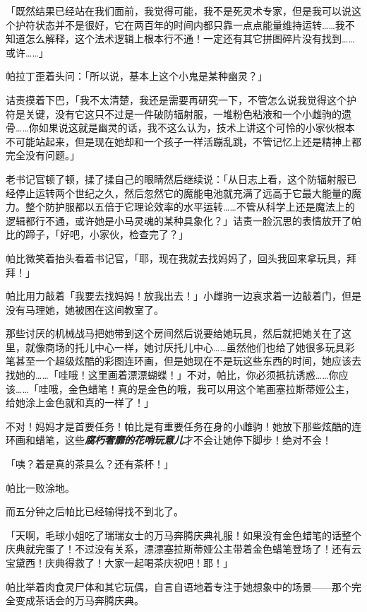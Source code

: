 「既然结果已经站在我们面前，我觉得可能，我不是死灵术专家，但是我可以说这个护符状态并不是很好，它在两百年的时间内都只靠一点点能量维持运转……我不知道怎么解释，这个法术逻辑上根本行不通！一定还有其它拼图碎片没有找到……或许……」

帕拉丁歪着头问：「所以说，基本上这个小鬼是某种幽灵？」

诘责摸着下巴，「我不太清楚，我还是需要再研究一下，不管怎么说我觉得这个护符是关键，没有它这只不过是一件破防辐射服，一堆粉色粘液和一个小雌驹的遗骨……你如果说这就是幽灵的话，我不这么认为，技术上讲这个可怜的小家伙根本不可能站起来，但是现在她却和一个孩子一样活蹦乱跳，不管记忆上还是精神上都完全没有问题。」

老书记官顿了顿，揉了揉自己的眼睛然后继续说：「从日志上看，这个防辐射服已经停止运转两个世纪之久，然后忽然它的魔能电池就充满了远高于它最大能量的魔力。整个防护服都以五倍于它理论效率的水平运转……不管从科学上还是魔法上的逻辑都行不通，或许她是小马灵魂的某种具象化？」诘责一脸沉思的表情放开了帕比的蹄子，「好吧，小家伙，检查完了？」

帕比微笑着抬头看着书记官，「耶，现在我就去找妈妈了，回头我回来拿玩具，拜拜！」

\horizonline


帕比用力敲着「我要去找妈妈！放我出去！」小雌驹一边哀求着一边敲着门，但是没有马理她，她被困在这间教室了。

那些讨厌的机械战马把她带到这个房间然后说要给她玩具，然后就把她关在了这里，就像商场的托儿中心一样，她讨厌托儿中心……虽然他们也给了她很多玩具彩笔甚至一个超级炫酷的彩图连环画，但是她现在不是玩这些东西的时间，她应该去找她的……「哇哦！这里画着漂漂蝴蝶！」不对，帕比，你必须抵抗诱惑……你应该……「哇哦，金色蜡笔！真的是金色的哦，我可以用这个笔画塞拉斯蒂娅公主，给她涂上金色就和真的一样了！」

不对！妈妈才是首要任务！帕比是有重要任务在身的小雌驹！她放下那些炫酷的连环画和蜡笔，这些\emph{\textbf{腐朽奢靡的花哨玩意儿}}才不会让她停下脚步！绝对不会！

「咦？着是真的茶具么？还有茶杯！」

帕比一败涂地。

而五分钟之后帕比已经输得找不到北了。

「天啊，毛球小姐吃了瑞瑞女士的万马奔腾庆典礼服！如果没有金色蜡笔的话整个庆典就完蛋了！不过没有关系，漂漂塞拉斯蒂娅公主带着金色蜡笔登场了！还有云宝黛西！庆典得救了！大家一起喝茶庆祝吧！耶！」

帕比举着肉食灵尸体和其它玩偶，自言自语地着专注于她想象中的场景——那个完全变成茶话会的万马奔腾庆典。

